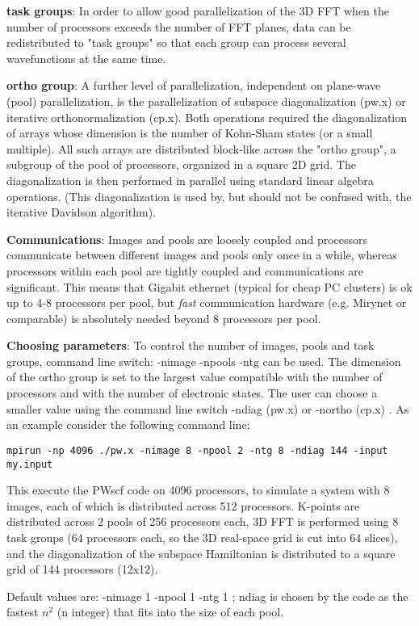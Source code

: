 \documentclass[12pt,a4paper]{article}
\begin{document}
{\bf task groups}: 
In order to allow good parallelization of the 3D FFT when 
the number of processors exceeds the number of FFT planes,
data can be redistributed to "task groups" so that each group 
can process several wavefunctions at the same time.

{\bf ortho group}:
A further level of parallelization, independent on
plane-wave (pool) parallelization, is the parallelization of
subspace diagonalization (pw.x) or iterative orthonormalization
(cp.x). Both operations required the diagonalization of 
arrays whose dimension is the number of Kohn-Sham states
(or a small multiple). All such arrays are distributed block-like
across the "ortho group", a subgroup of the pool of processors,
organized in a square 2D grid. The diagonalization is then performed
in parallel using standard linear algebra operations. 
(This diagonalization is used by, but should not be confused with,
the iterative Davidson algorithm).

{\bf Communications}:
Images and pools are loosely coupled and processors communicate
between different images and pools only once in a while, whereas
processors within each pool are tightly coupled and communications
are significant. This means that Gigabit ethernet (typical for
cheap PC clusters) is ok up to 4-8 processors per pool, but {\em fast}
communication hardware (e.g. Mirynet or comparable) is absolutely 
needed beyond 8 processors per pool.

{\bf Choosing parameters}:
To control the number of images, pools and task groups,
command line switch: -nimage -npools -ntg can be used.
The dimension of the ortho group is set to the largest
value compatible with the number of processors and with
the number of electronic states. The user can choose a smaller
value using the command line switch -ndiag (pw.x) or -northo (cp.x) .
As an example consider the following command line:
\begin{verbatim}
mpirun -np 4096 ./pw.x -nimage 8 -npool 2 -ntg 8 -ndiag 144 -input my.input
\end{verbatim}
This execute the PWscf code on 4096 processors, to simulate a system
with 8 images, each of which is distributed across 512 processors.
K-points are distributed across 2 pools of 256 processors each, 
3D FFT is performed using 8 task groups (64 processors each, so
the 3D real-space grid is cut into 64 slices), and the diagonalization
of the subspace Hamiltonian is distributed to a square grid of 144
processors (12x12).

Default values are: -nimage 1 -npool 1 -ntg 1 ; ndiag is chosen
by the code as the fastest $n^2$ (n integer) that fits into the size
of each pool.
\end{document}
